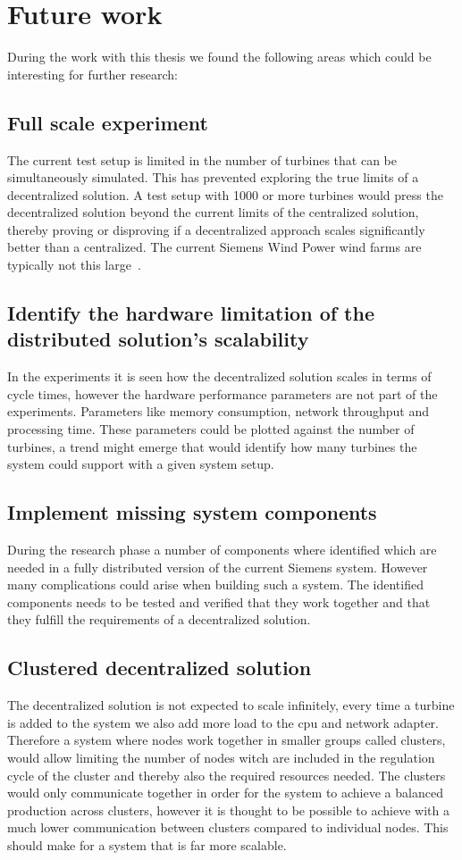 \chapter{Future work}
\label{sec:futWork}
During the work with this thesis we found the following areas which could be interesting for further research:

\section{Full scale experiment}
The current test setup is limited in the number of turbines that can be simultaneously simulated. This has prevented exploring the true limits of a decentralized solution.
A test setup with 1000 or more turbines would press the decentralized solution beyond the current limits of the centralized solution, thereby proving or disproving if a decentralized approach scales significantly better than a centralized. The current Siemens Wind Power wind farms are typically not this large~\cite{simensOnShoreProjects,simensOffShoreProjects}.


\section{Identify the hardware limitation of the distributed solution's scalability}
In the experiments it is seen how the decentralized solution scales in terms of cycle times, however the hardware performance parameters are not part of the experiments.
Parameters like memory consumption, network throughput and processing time. These parameters could be plotted against the number of turbines, a trend might emerge that would identify how many turbines the system could support with a given system setup.


\section{Implement missing system components}
During the research phase a number of components where identified which are needed in a fully distributed version of the current Siemens system.
However many complications could arise when building such a system. The identified components needs to be tested and verified that they work together and that they fulfill the requirements of a decentralized solution. 


\section{Clustered decentralized solution}
The decentralized solution is not expected to scale infinitely, every time a turbine is added to the system we also add more load to the cpu and network adapter.
Therefore a system where nodes work together in smaller groups called clusters, would allow limiting the number of nodes witch are included in the regulation cycle of the cluster and thereby also the required resources needed. 
The clusters would only communicate together in order for the system to achieve a balanced production across clusters, however it is thought to be possible to achieve with a much lower communication between clusters compared to individual nodes.
This should make for a system that is far more scalable.


